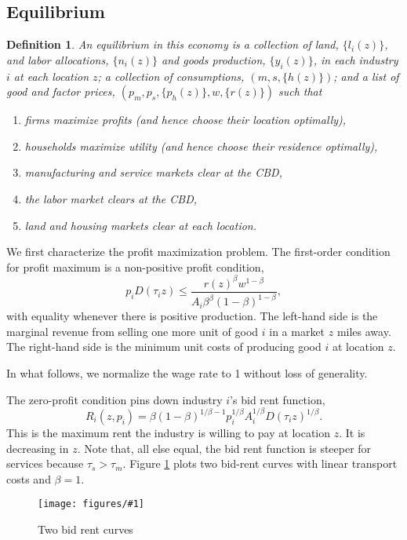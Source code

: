 \documentclass[12pt]{article}
\newtheorem{definition}{Definition}
\newcommand{\dofigure}[2]{\begin{figure}
\begin{centering}
\texttt{[image: figures/\#1]}
  \caption{#2\label{fig:#1}}
\end{centering}
\end{figure}}
\begin{document}
\subsection{Equilibrium}
\begin{definition}
 An \emph{equilibrium} in this economy is a collection of land, $\{l_i(z)\}$, and labor allocations, $\{n_i(z)\}$ and goods production, $\{y_i(z)\}$, in each industry $i$ at each location $z$; a collection of consumptions, $(m,s,\{h(z)\})$; and a list of good and factor prices, $(p_m,p_s,\{p_h(z)\},w,\{r(z)\})$ such that
\begin{enumerate}
 \item firms maximize profits (and hence choose their location optimally),
 \item households maximize utility (and hence choose their residence optimally),
 \item manufacturing and service markets clear at the CBD,
 \item the labor market clears at the CBD,
 \item land and housing markets clear at each location.
\end{enumerate}
\end{definition}
We first characterize the profit maximization problem. The first-order condition for profit maximum is a non-positive profit condition,
\[
p_i D(\tau_i z) \le \frac{r(z)^\beta w^{1-\beta}}{A_i\beta^\beta (1-\beta)^{1-\beta}},
\]
with equality whenever there is positive production. The left-hand side is the marginal revenue from selling one more unit of good $i$ in a market $z$ miles away. The right-hand side is the minimum unit costs of producing good $i$ at location $z$.

In what follows, we normalize the wage rate to 1 without loss of generality.

The zero-profit condition pins down industry $i$'s bid rent function,
\begin{equation}\label{eq:bidrent:industry}
R_i(z,p_i) = \beta (1-\beta)^{1/\beta-1} p_i^{1/\beta} A_i^{1/\beta} D(\tau_i z)^{1/\beta}.
\end{equation}
This is the maximum rent the industry is willing to pay at location $z$. It is decreasing in $z$. Note that, all else equal, the bid rent function is steeper for services because $\tau_s>\tau_m$. Figure \ref{fig:bid-rent-2} plots two bid-rent curves with linear transport costs and $\beta=1$.

\dofigure{bid-rent-2}{Two bid rent curves}
\end{document}
